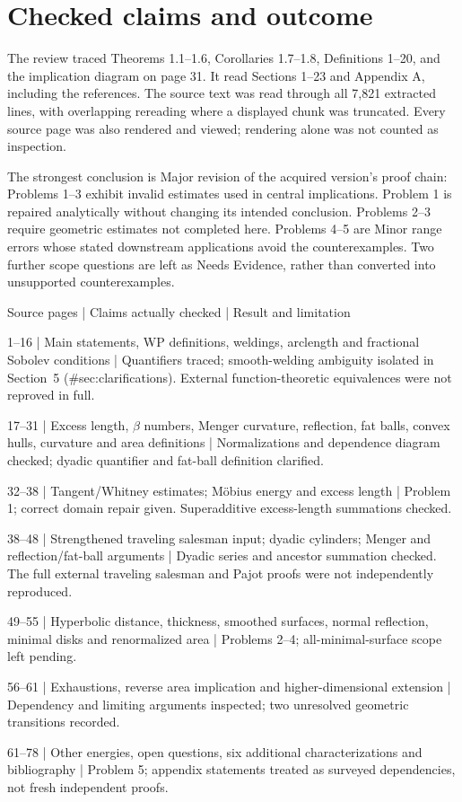 \documentclass[10pt]{article}
\begin{document}
\section*{Checked claims and outcome}
The review traced Theorems 1.1–1.6, Corollaries 1.7–1.8, Definitions 1–20, and the implication diagram on page 31. It read Sections 1–23 and Appendix A, including the references. The source text was read through all 7,821 extracted lines, with overlapping rereading where a displayed chunk was truncated. Every source page was also rendered and viewed; rendering alone was not counted as inspection.\par
The strongest conclusion is Major revision of the acquired version’s proof chain: Problems 1–3 exhibit invalid estimates used in central implications. Problem 1 is repaired analytically without changing its intended conclusion. Problems 2–3 require geometric estimates not completed here. Problems 4–5 are Minor range errors whose stated downstream applications avoid the counterexamples. Two further scope questions are left as Needs Evidence, rather than converted into unsupported counterexamples.\par
Source pages | Claims actually checked | Result and limitation\par
1–16 | Main statements, WP definitions, weldings, arclength and fractional Sobolev conditions | Quantifiers traced; smooth-welding ambiguity isolated in Section 5 (\#sec:clarifications). External function-theoretic equivalences were not reproved in full.\par
17–31 | Excess length, \(\beta\) numbers, Menger curvature, reflection, fat balls, convex hulls, curvature and area definitions | Normalizations and dependence diagram checked; dyadic quantifier and fat-ball definition clarified.\par
32–38 | Tangent/Whitney estimates; Möbius energy and excess length | Problem 1; correct domain repair given. Superadditive excess-length summations checked.\par
38–48 | Strengthened traveling salesman input; dyadic cylinders; Menger and reflection/fat-ball arguments | Dyadic series and ancestor summation checked. The full external traveling salesman and Pajot proofs were not independently reproduced.\par
49–55 | Hyperbolic distance, thickness, smoothed surfaces, normal reflection, minimal disks and renormalized area | Problems 2–4; all-minimal-surface scope left pending.\par
56–61 | Exhaustions, reverse area implication and higher-dimensional extension | Dependency and limiting arguments inspected; two unresolved geometric transitions recorded.\par
61–78 | Other energies, open questions, six additional characterizations and bibliography | Problem 5; appendix statements treated as surveyed dependencies, not fresh independent proofs.\par
\end{document}
